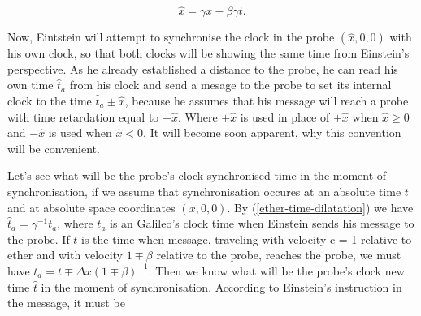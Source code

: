 \documentclass[main.tex]{subfiles}
\begin{document}
\begin{equation}
\hat{x} = \gamma x - \beta\gamma t.
\end{equation}

Now, Eintstein will attempt to synchronise the clock in the probe $(\hat{x}, 0, 0)$ with his own clock, so that both clocks will be showing the same time from Einstein's perspective. As he already established a distance to the probe, he can read his own time $\hat{t}_a$ from his clock and send a mesage to the probe to set its internal clock to the time $\hat{t}_a \pm \hat{x}$, because he assumes that his message will reach a probe with time retardation equal to $\pm\hat{x}$. Where $+\hat{x}$ is used in place of $\pm\hat{x}$ when $\hat{x} \geq 0$ and $-\hat{x}$ is used when $\hat{x} < 0$. It will become soon apparent, why this convention will be convenient. 

Let's see what will be the probe's clock synchronised time in the moment of synchronisation, if we assume that synchronisation occures at an absolute time $t$ and at absolute space coordinates $(x, 0, 0)$. By (\ref{ether-time-dilatation}) we have $\hat{t}_a = \gamma^{-1} t_a$, where $t_a$ is an Galileo's clock time when Einstein sends his message to the probe. If $t$ is the time when message, traveling with velocity c = 1 relative to ether and with velocity $1 \mp \beta$ relative to the probe, reaches the probe, we must have $t_a = t \mp \Delta x (1 \mp \beta)^{-1}$. Then we know what will be the probe's clock new time $\hat{t}$ in the moment of synchronisation. According to Einstein's instruction in the message, it must be
\end{document}
